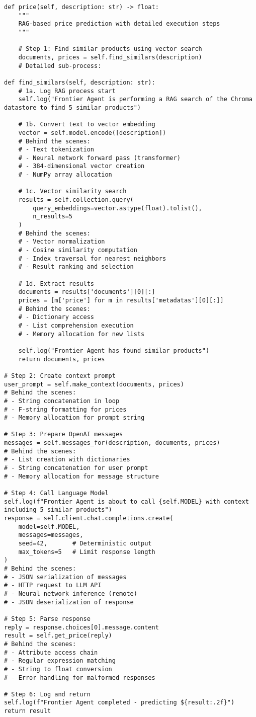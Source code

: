 \begin{lstlisting}[caption=FrontierAgent Detailed RAG Process]
def price(self, description: str) -> float:
    """
    RAG-based price prediction with detailed execution steps
    """
    
    # Step 1: Find similar products using vector search
    documents, prices = self.find_similars(description)
    # Detailed sub-process:
    
def find_similars(self, description: str):
    # 1a. Log RAG process start
    self.log("Frontier Agent is performing a RAG search of the Chroma datastore to find 5 similar products")
    
    # 1b. Convert text to vector embedding
    vector = self.model.encode([description])
    # Behind the scenes:
    # - Text tokenization
    # - Neural network forward pass (transformer)
    # - 384-dimensional vector creation
    # - NumPy array allocation
    
    # 1c. Vector similarity search
    results = self.collection.query(
        query_embeddings=vector.astype(float).tolist(), 
        n_results=5
    )
    # Behind the scenes:
    # - Vector normalization
    # - Cosine similarity computation
    # - Index traversal for nearest neighbors
    # - Result ranking and selection
    
    # 1d. Extract results
    documents = results['documents'][0][:]
    prices = [m['price'] for m in results['metadatas'][0][:]]
    # Behind the scenes:
    # - Dictionary access
    # - List comprehension execution
    # - Memory allocation for new lists
    
    self.log("Frontier Agent has found similar products")
    return documents, prices

# Step 2: Create context prompt
user_prompt = self.make_context(documents, prices)
# Behind the scenes:
# - String concatenation in loop
# - F-string formatting for prices
# - Memory allocation for prompt string

# Step 3: Prepare OpenAI messages
messages = self.messages_for(description, documents, prices)
# Behind the scenes:
# - List creation with dictionaries
# - String concatenation for user prompt
# - Memory allocation for message structure

# Step 4: Call Language Model
self.log(f"Frontier Agent is about to call {self.MODEL} with context including 5 similar products")
response = self.client.chat.completions.create(
    model=self.MODEL, 
    messages=messages,
    seed=42,       # Deterministic output
    max_tokens=5   # Limit response length
)
# Behind the scenes:
# - JSON serialization of messages
# - HTTP request to LLM API
# - Neural network inference (remote)
# - JSON deserialization of response

# Step 5: Parse response
reply = response.choices[0].message.content
result = self.get_price(reply)
# Behind the scenes:
# - Attribute access chain
# - Regular expression matching
# - String to float conversion
# - Error handling for malformed responses

# Step 6: Log and return
self.log(f"Frontier Agent completed - predicting ${result:.2f}")
return result
\end{lstlisting}

